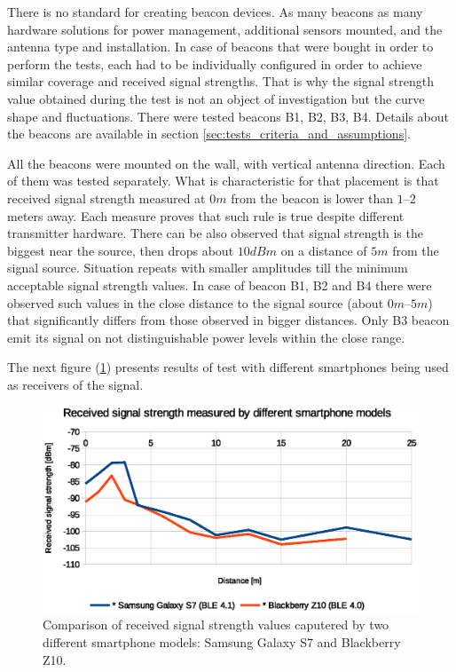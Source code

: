 \documentclass[../main.tex]{subfiles}
\begin{document}
There is no standard for creating beacon devices. As many beacons as many hardware solutions for power management, additional sensors mounted, and the antenna type and installation. In case of beacons that were bought in order to perform the tests, each had to be individually configured in order to achieve similar coverage and received signal strengths. That is why the signal strength value obtained during the test is not an object of investigation but the curve shape and fluctuations. There were tested beacons B1, B2, B3, B4. Details about the beacons are available in section \ref{sec:tests_criteria_and_assumptions}.

All the beacons were mounted on the wall, with vertical antenna direction. Each of them was tested separately. What is characteristic for that placement is that received signal strength measured at $0 m$ from the beacon is lower than $1$--$2$ meters away. Each measure proves that such rule is true despite different transmitter hardware. There can be also observed that signal strength is the biggest near the source, then drops about $10dBm$ on a distance of $5m$ from the signal source. Situation repeats with smaller amplitudes till the minimum acceptable signal strength values. In case of beacon B1, B2 and B4 there were observed such values in the close distance to the signal source (about $0m$--$5m$) that significantly differs from those observed in bigger distances. Only B3 beacon emit its signal on not distinguishable power levels within the close range.

The next figure (\ref{fig:tests_case9_smartphone_comparison}) presents results of test with different smartphones being used as receivers of the signal.

\begin{figure}[!htbp]
\includegraphics[width=\textwidth, keepaspectratio]{pictures/tests_case9_smartphone_comparison}
\centering
\caption{Comparison of received signal strength values caputered by two different smartphone models: Samsung Galaxy S7 and Blackberry Z10.}
\label{fig:tests_case9_smartphone_comparison}
\end{figure}
\end{document}

